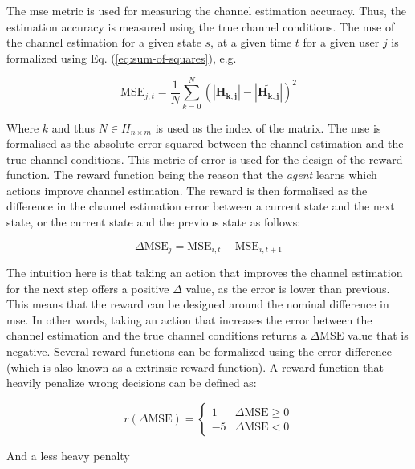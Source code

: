 The \gls{mse} metric is used for measuring the channel estimation accuracy. Thus, the estimation accuracy is measured using the true channel conditions. The \gls{mse} of the channel estimation for a given state $s$, at a given time $t$ for a given user $j$ is formalized using Eq. (\ref{eq:sum-of-squares}), e.g.

\begin{equation}\label{eq:mse_channel_estimation}
    \text{MSE}_{j,t} = \frac{1}{N} \sum_{k = 0}^{N} ( |\mathbf{H_{k,j}}| - |\mathbf{\widetilde{H_{k,j}}}| )^2
\end{equation}

Where $k$ and thus $N \in H_{n \times m}$ is used as the index of the matrix. The \gls{mse} is formalised as the absolute error squared between the channel estimation and the true channel conditions. This metric of error is used for the design of the reward function. The reward function being the reason that the \emph{agent} learns which actions improve channel estimation. The reward is then formalised as the difference in the channel estimation error between a current state and the next state, or the current state and the previous state as follows:

\begin{equation}
    \Delta \text{MSE}_j = \text{MSE}_{i,t} - \text{MSE}_{i,t+1}
\end{equation}

The intuition here is that taking an action that improves the channel estimation for the next step offers a positive $\Delta$ value, as the error is lower than previous. This means that the reward can be designed around the nominal difference in \gls{mse}. In other words, taking an action that increases the error between the channel estimation and the true channel conditions returns a $\Delta \text{MSE}$ value that is negative. Several reward functions can be formalized using the error difference (which is also known as a extrinsic reward function). A reward function that heavily penalize wrong decisions can be defined as:

\begin{equation}\label{eq:reward_minus_5}
r(\Delta \text{MSE}) = \begin{cases}
1 &\Delta \text{MSE} \geq 0\\
-5 &\Delta \text{MSE} < 0
\end{cases}
\end{equation}

\noindent And a less heavy penalty


